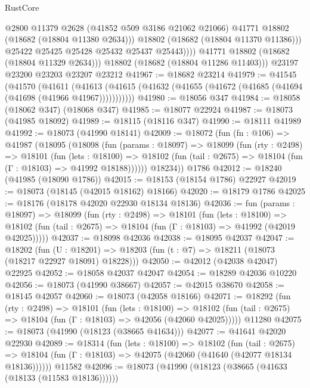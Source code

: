 \begin{lexlean}{RustCore}
\begin{coremodule}
                    @2800
                    @11379
                    @2628
                    (@41852 @509 @3186 @21062 @21066)
                    @41771
                    @18802
                    (@18682 (@18804 @11380 @2634)))
                  @18802
                  (@18682 (@18804 @11370 @11386)))
                @25422
                @25425
                @25428
                @25432
                @25437
                @25443))))
        @41771
        @18802
        (@18682 (@18804 @11329 @2634)))
      @18802
      (@18682 (@18804 @11286 @11403)))
    @23197
    @23200
    @23203
    @23207
    @23212
@41967 := @18682 @23214
@41979 := @41545
    (@41570
      (@41611
        (@41613 (@41615 (@41632 (@41655 (@41672 (@41685 (@41694 (@41698 (@41966 @41967)))))))))))
@41980 := @18056 @347
@41984 := @18058 (@18062 @347) (@18068 @347)
@41985 := @18077 @22924
@41987 := @18073 (@41985 @18092)
@41989 := @18115 (@18116 @347)
@41990 := @18111 @41989
@41992 := @18073 (@41990 @18141)
@42009 := @18072
    (fun (fn : @106) =>
    @41987
      (@18095
        (@18098
          (fun (params : @18097) =>
          @18099
            (fun (rty : @2498) =>
            @18101
              (fun (lets : @18100) =>
              @18102 (fun (tail : @2675) => @18104 (fun (Γ : @18103) => @41992 @18188))))))
        @18234))
    @1786
@42012 := @18240 (@41985 (@18090 @1786))
@42015 := @18153 (@18154 @1786) @22927
@42019 := @18073 (@18145 (@42015 @18162) @18166)
@42020 := @18179 @1786
@42025 := @18176 (@18178 @42020 @22930 @18134 @18136)
@42036 := fun (params : @18097) =>
  @18099
    (fun (rty : @2498) =>
    @18101
      (fun (lets : @18100) =>
      @18102 (fun (tail : @2675) => @18104 (fun (Γ : @18103) => @41992 (@42019 @42025)))))
@42037 := @18098 @42036
@42038 := @18095 @42037
@42047 := @18202
    (fun (U : @18201) => @18203 (fun (t : @7) => @18211 (@18073 (@18217 @22927 @18091) @18228)))
@42050 := @42012 (@42038 @42047) @22925
@42052 := @18058 @42037 @42047
@42054 := @18289 @42036 @10220
@42056 := @18073 (@41990 @38667)
@42057 := @42015 @38670
@42058 := @18145 @42057
@42060 := @18073 (@42058 @18166)
@42071 := @18292
    (fun (rty : @2498) =>
    @18101
      (fun (lets : @18100) =>
      @18102 (fun (tail : @2675) => @18104 (fun (Γ : @18103) => @42056 (@42060 @42025)))))
    @11280
@42075 := @18073 (@41990 (@18123 (@38665 @41634)))
@42077 := @41641 @42020 @22930
@42089 := @18314
    (fun (lets : @18100) =>
    @18102
      (fun (tail : @2675) =>
      @18104 (fun (Γ : @18103) => @42075 (@42060 (@41640 (@42077 @18134 @18136))))))
    @11582
@42096 := @18073 (@41990 (@18123 (@38665 (@41633 (@18133 (@11583 @18136))))))

\end{coremodule}
\end{lexlean}
